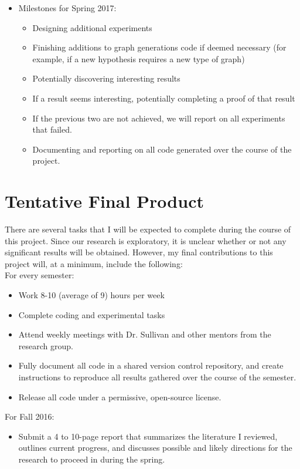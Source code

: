 \documentclass[a4paper,10pt]{article}
\begin{document}
\begin{itemize}
\begin{itemize}
		\end{itemize}
		\item Milestones for Spring 2017:
		\begin{itemize}
			\item Designing additional experiments
			\item Finishing additions to graph generations code if deemed necessary (for example, if a new hypothesis requires a new type of graph)
			\item Potentially discovering interesting results
			\item If a result seems interesting, potentially completing a proof of that result
			\item If the previous two are not achieved, we will report on all experiments that failed.
			\item Documenting and reporting on all code generated over the course of the project.
		\end{itemize}
	\end{itemize}

	\section{Tentative Final Product}
	There are several tasks that I will be expected to complete during the course of this project.  Since our research is exploratory, it is unclear whether or not any significant results will be obtained.  However, my final contributions to this project will, at a minimum, include the following:\\

	\noindent
	For every semester:
	\begin{itemize}
		\item Work 8-10 (average of 9) hours per week
		\item Complete coding and experimental tasks
		\item Attend weekly meetings with Dr. Sullivan and other mentors from the research group.
		\item Fully document all code in a shared version control repository, and create instructions to reproduce all results gathered over the course of the semester.
		\item Release all code under a permissive, open-source license.
	\end{itemize}

	\noindent
	For Fall 2016:
	\begin{itemize}
		\item Submit a 4 to 10-page report that summarizes the literature I reviewed, outlines current progress, and discusses possible and likely directions for the research to proceed in during the spring.
	\end{itemize}
\end{document}
